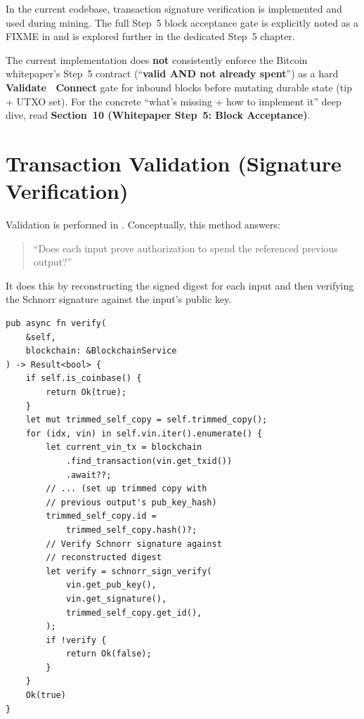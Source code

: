 In the current codebase, transaction signature verification is implemented and used during mining. The full Step~5 block acceptance gate is explicitly noted as a FIXME in  and is explored further in the dedicated Step~5 chapter.

\begin{warnbox}
The current implementation does \textbf{not} consistently enforce the Bitcoin whitepaper's Step~5 contract (``\textbf{valid AND not already spent}'') as a hard \textbf{Validate \textrightarrow\ Connect} gate for inbound blocks before mutating durable state (tip + UTXO set). For the concrete ``what's missing + how to implement it'' deep dive, read \textbf{Section~10 (Whitepaper Step~5: Block Acceptance)}.
\end{warnbox}

\section{Transaction Validation (Signature Verification)}
\label{sec:ch09-7-tx-validation}

Validation is performed in . Conceptually, this method answers:

\begin{quote}
``Does each input prove authorization to spend the referenced previous output?''
\end{quote}

It does this by reconstructing the signed digest for each input and then verifying the Schnorr signature against the input's public key.

\begin{listing}[htbp]
\caption{Transaction validity (signature verification) ()}
\label{lst:9-7-1}
\begin{verbatim}
pub async fn verify(
    &self,
    blockchain: &BlockchainService
) -> Result<bool> {
    if self.is_coinbase() {
        return Ok(true);
    }
    let mut trimmed_self_copy = self.trimmed_copy();
    for (idx, vin) in self.vin.iter().enumerate() {
        let current_vin_tx = blockchain
            .find_transaction(vin.get_txid())
            .await??;
        // ... (set up trimmed copy with
        // previous output's pub_key_hash)
        trimmed_self_copy.id =
            trimmed_self_copy.hash()?;
        // Verify Schnorr signature against
        // reconstructed digest
        let verify = schnorr_sign_verify(
            vin.get_pub_key(),
            vin.get_signature(),
            trimmed_self_copy.get_id(),
        );
        if !verify {
            return Ok(false);
        }
    }
    Ok(true)
}
\end{verbatim}
\end{listing}

